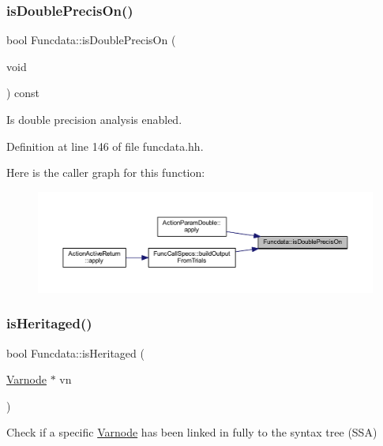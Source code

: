\subsubsection{\texorpdfstring{isDoublePrecisOn()}{isDoublePrecisOn()}}
{\footnotesize\ttfamily bool Funcdata\+::is\+Double\+Precis\+On (\begin{DoxyParamCaption}\item[{void}]{ }\end{DoxyParamCaption}) const\hspace{0.3cm}{\ttfamily [inline]}}



Is double precision analysis enabled. 



Definition at line 146 of file funcdata.\+hh.

Here is the caller graph for this function\+:
\nopagebreak
\begin{figure}[H]
\begin{center}
\leavevmode
\includegraphics[width=350pt]{class_funcdata_a34f5244a2b3edcf7276f0084f7b48281_icgraph}
\end{center}
\end{figure}
\mbox{\label{class_funcdata_a803cbb38fe59825f59858a16afa54b7d}} 
\subsubsection{\texorpdfstring{isHeritaged()}{isHeritaged()}}
{\footnotesize\ttfamily bool Funcdata\+::is\+Heritaged (\begin{DoxyParamCaption}\item[{\mbox{\hyperlink{class_varnode}{Varnode}} $\ast$}]{vn }\end{DoxyParamCaption})\hspace{0.3cm}{\ttfamily [inline]}}



Check if a specific \mbox{\hyperlink{class_varnode}{Varnode}} has been linked in fully to the syntax tree (S\+SA) 


